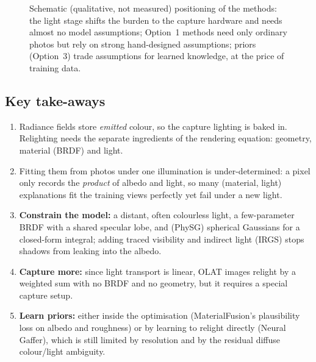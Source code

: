 \documentclass[11pt,a4paper]{article}
\theoremstyle{definition}
\theoremstyle{plain}
\theoremstyle{remark}
\begin{document}
\begin{figure}[!htbp]\centering
{}
\caption{Schematic (qualitative, not measured) positioning of the methods: the light stage shifts the burden to the capture hardware and needs almost no model assumptions; Option~1 methods need only ordinary photos but rely on strong hand-designed assumptions; priors (Option~3) trade assumptions for learned knowledge, at the price of training data.}
\end{figure}

\subsection*{Key take-aways}
\begin{enumerate}
 \item Radiance fields store \emph{emitted} colour, so the capture lighting is baked in. Relighting needs the separate ingredients of the rendering equation: geometry, material (BRDF) and light.
 \item Fitting them from photos under one illumination is under-determined: a pixel only records the \emph{product} of albedo and light, so many (material, light) explanations fit the training views perfectly yet fail under a new light.
 \item \textbf{Constrain the model:} a distant, often colourless light, a few-parameter BRDF with a shared specular lobe, and (PhySG) spherical Gaussians for a closed-form integral; adding traced visibility and indirect light (IRGS) stops shadows from leaking into the albedo.
 \item \textbf{Capture more:} since light transport is linear, OLAT images relight by a weighted sum with no BRDF and no geometry, but it requires a special capture setup.
 \item \textbf{Learn priors:} either inside the optimisation (MaterialFusion's plausibility loss on albedo and roughness) or by learning to relight directly (Neural Gaffer), which is still limited by resolution and by the residual diffuse colour/light ambiguity.
\end{enumerate}
\end{document}
